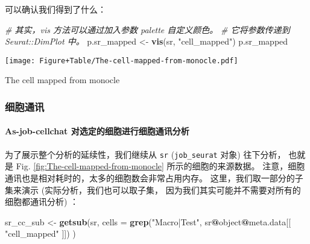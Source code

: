 \documentclass[
]{article}
\newenvironment{Shaded}{\begin{snugshade}}{\end{snugshade}}
\newcommand{\CommentTok}[1]{\textcolor[rgb]{0.56,0.35,0.01}{\textit{#1}}}
\newcommand{\DataTypeTok}[1]{\textcolor[rgb]{0.13,0.29,0.53}{#1}}
\newcommand{\KeywordTok}[1]{\textcolor[rgb]{0.13,0.29,0.53}{\textbf{#1}}}
\newcommand{\NormalTok}[1]{#1}
\newcommand{\OperatorTok}[1]{\textcolor[rgb]{0.81,0.36,0.00}{\textbf{#1}}}
\newcommand{\StringTok}[1]{\textcolor[rgb]{0.31,0.60,0.02}{#1}}
\begin{document}
可以确认我们得到了什么：

\begin{Shaded}
\begin{Highlighting}[]
\CommentTok{\# 其实，\textasciigrave{}vis\textasciigrave{} 方法可以通过加入参数 \textasciigrave{}palette\textasciigrave{} 自定义颜色。}
\CommentTok{\# 它将参数传递到 \textasciigrave{}Seurat::DimPlot\textasciigrave{} 中。}
\NormalTok{p.sr\_mapped \textless{}{-}}\StringTok{ }\KeywordTok{vis}\NormalTok{(sr, }\StringTok{"cell\_mapped"}\NormalTok{)}
\NormalTok{p.sr\_mapped}
\end{Highlighting}
\end{Shaded}

\def\@captype{figure}
\begin{center}
\texttt{[image: Figure+Table/The-cell-mapped-from-monocle.pdf]}
\caption{The cell mapped from monocle}\label{fig:The-cell-mapped-from-monocle}
\end{center}

\hypertarget{ux7ec6ux80deux901aux8baf}{%
\subsubsection{细胞通讯}\label{ux7ec6ux80deux901aux8baf}}

\hypertarget{as-job-cellchat-ux5bf9ux9009ux5b9aux7684ux7ec6ux80deux8fdbux884cux7ec6ux80deux901aux8bafux5206ux6790}{%
\paragraph{As-job-cellchat 对选定的细胞进行细胞通讯分析}\label{as-job-cellchat-ux5bf9ux9009ux5b9aux7684ux7ec6ux80deux8fdbux884cux7ec6ux80deux901aux8bafux5206ux6790}}

为了展示整个分析的延续性，我们继续从 \texttt{sr} (\texttt{job\_seurat} 对象) 往下分析，
也就是 Fig. \ref{fig:The-cell-mapped-from-monocle} 所示的细胞的来源数据。
注意，细胞通讯也是相对耗时的，太多的细胞数会非常占用内存。
这里，我们取一部分的子集来演示 (实际分析，我们也可以取子集，
因为我们其实可能并不需要对所有的细胞都通讯分析) ：

\begin{Shaded}
\begin{Highlighting}[]
\NormalTok{sr\_cc\_sub \textless{}{-}}\StringTok{ }\KeywordTok{getsub}\NormalTok{(sr,}
  \DataTypeTok{cells =} \KeywordTok{grep}\NormalTok{(}\StringTok{"Macro|Test"}\NormalTok{, sr}\OperatorTok{@}\NormalTok{object}\OperatorTok{@}\NormalTok{meta.data[[ }\StringTok{"cell\_mapped"}\NormalTok{ ]])}
\NormalTok{)}
\end{Highlighting}
\end{Shaded}
\end{document}
